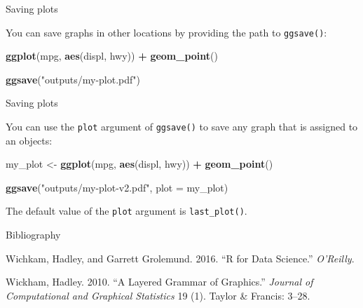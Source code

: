 \documentclass[ignorenonframetext,]{beamer}
\newenvironment{Shaded}{\begin{snugshade}}{\end{snugshade}}
\newcommand{\DataTypeTok}[1]{\textcolor[rgb]{0.13,0.29,0.53}{#1}}
\newcommand{\KeywordTok}[1]{\textcolor[rgb]{0.13,0.29,0.53}{\textbf{#1}}}
\newcommand{\NormalTok}[1]{#1}
\newcommand{\OperatorTok}[1]{\textcolor[rgb]{0.81,0.36,0.00}{\textbf{#1}}}
\newcommand{\StringTok}[1]{\textcolor[rgb]{0.31,0.60,0.02}{#1}}
\begin{document}
\begin{frame}[fragile]{Saving plots}
\protect\hypertarget{saving-plots-2}{}

You can save graphs in other locations by providing the path to
\texttt{ggsave()}:

\begin{Shaded}
\begin{Highlighting}[]
\KeywordTok{ggplot}\NormalTok{(mpg, }\KeywordTok{aes}\NormalTok{(displ, hwy)) }\OperatorTok{+}
\StringTok{  }\KeywordTok{geom_point}\NormalTok{()}

\KeywordTok{ggsave}\NormalTok{(}\StringTok{"outputs/my-plot.pdf"}\NormalTok{)}
\end{Highlighting}
\end{Shaded}

\end{frame}

\begin{frame}[fragile]{Saving plots}
\protect\hypertarget{saving-plots-3}{}

You can use the \texttt{plot} argument of \texttt{ggsave()} to save any
graph that is assigned to an objects:

\begin{Shaded}
\begin{Highlighting}[]
\NormalTok{my_plot <-}\StringTok{ }\KeywordTok{ggplot}\NormalTok{(mpg, }\KeywordTok{aes}\NormalTok{(displ, hwy)) }\OperatorTok{+}
\StringTok{  }\KeywordTok{geom_point}\NormalTok{()}

\KeywordTok{ggsave}\NormalTok{(}\StringTok{"outputs/my-plot-v2.pdf"}\NormalTok{, }\DataTypeTok{plot =}\NormalTok{ my_plot)}
\end{Highlighting}
\end{Shaded}

The default value of the \texttt{plot} argument is
\texttt{last\_plot()}.

\end{frame}

\begin{frame}{Bibliography}
\protect\hypertarget{bibliography}{}

\hypertarget{refs}{}
\leavevmode\hypertarget{ref-wichkam2016r}{}%
Wichkam, Hadley, and Garrett Grolemund. 2016. ``R for Data Science.''
\emph{O'Reilly}.

\leavevmode\hypertarget{ref-wickham2010layered}{}%
Wickham, Hadley. 2010. ``A Layered Grammar of Graphics.'' \emph{Journal
of Computational and Graphical Statistics} 19 (1). Taylor \& Francis:
3--28.

\end{frame}
\end{document}
